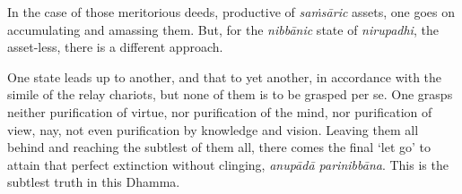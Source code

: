 In the case of those meritorious deeds, productive of \emph{saṁsāric} assets, one goes on accumulating and amassing them. But, for the \emph{nibbānic} state of \emph{nirupadhi}, the asset-less, there is a different approach.

One state leads up to another, and that to yet another, in accordance with the simile of the relay chariots, but none of them is to be grasped per se. One grasps neither purification of virtue, nor purification of the mind, nor purification of view, nay, not even purification by knowledge and vision. Leaving them all behind and reaching the subtlest of them all, there comes the final `let go' to attain that perfect extinction without clinging, \emph{anupādā parinibbāna}. This is the subtlest truth in this Dhamma.
